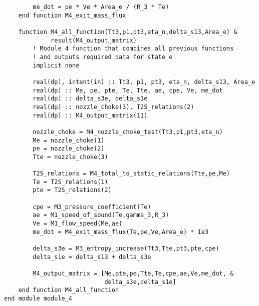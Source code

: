 \begin{verbatim}
        me_dot = pe * Ve * Area_e / (R_3 * Te)
    end function M4_exit_mass_flux

    function M4_all_function(Tt3,p1,pt3,eta_n,delta_s13,Area_e) &
             result(M4_output_matrix)
        ! Module 4 function that combines all previous functions
        ! and outputs required data for state e
        implicit none

        real(dp), intent(in) :: Tt3, p1, pt3, eta_n, delta_s13, Area_e
        real(dp) :: Me, pe, pte, Te, Tte, ae, cpe, Ve, me_dot
        real(dp) :: delta_s3e, delta_s1e
        real(dp) :: nozzle_choke(3), T2S_relations(2)
        real(dp) :: M4_output_matrix(11)

        nozzle_choke = M4_nozzle_choke_test(Tt3,p1,pt3,eta_n)
        Me = nozzle_choke(1)
        pe = nozzle_choke(2)
        Tte = nozzle_choke(3)

        T2S_relations = M4_total_to_static_relations(Tte,pe,Me)
        Te = T2S_relations(1)
        pte = T2S_relations(2)

        cpe = M3_pressure_coefficient(Te)
        ae = M1_speed_of_sound(Te,gamma_3,R_3)
        Ve = M1_flow_speed(Me,ae)
        me_dot = M4_exit_mass_flux(Te,pe,Ve,Area_e) * 1e3

        delta_s3e = M3_entropy_increase(Tt3,Tte,pt3,pte,cpe)
        delta_s1e = delta_s13 + delta_s3e

        M4_output_matrix = [Me,pte,pe,Tte,Te,cpe,ae,Ve,me_dot, &
                            delta_s3e,delta_s1e]
    end function M4_all_function
end module module_4
\end{verbatim}